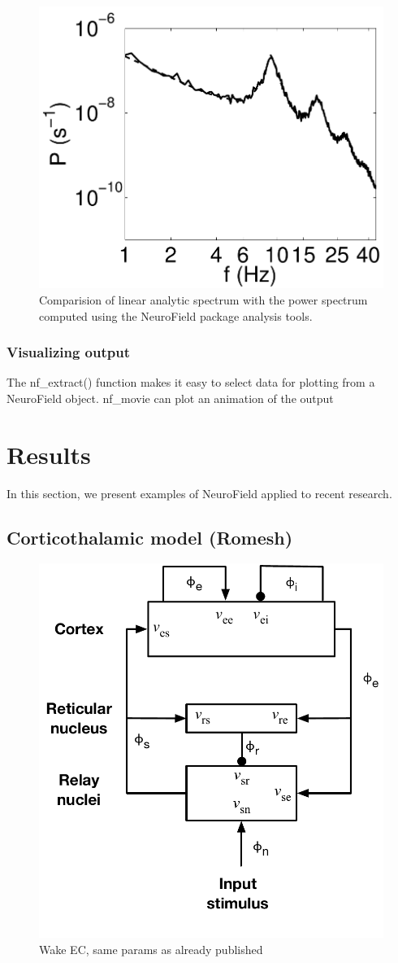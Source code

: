 \documentclass[preprint,review,10pt,authoryear,letterpaper]{elsarticle}
\begin{document}
\begin{figure}[!b]
\begin{center}
\includegraphics[width=0.80\columnwidth]{corticothalamic_comparison}
\caption{Comparision of linear analytic spectrum with the power spectrum computed using the NeuroField package analysis tools.}
\label{fig:ct_spectrum}
\end{center}
\end{figure}

\subsubsection{Visualizing output}
The nf\_extract() function makes it easy to select data for plotting from a NeuroField object.  
nf\_movie can plot an animation of the output


\section{Results}

In this section, we present examples of NeuroField applied to recent research.

\subsection{Corticothalamic model (Romesh)}

\begin{figure}[!b]
\begin{center}
\includegraphics[width=0.40\columnwidth]{EIRS_clean}
\caption{Wake EC, same params as already published}
\label{fig:ct_schematic}
\end{center}
\end{figure}
\end{document}
